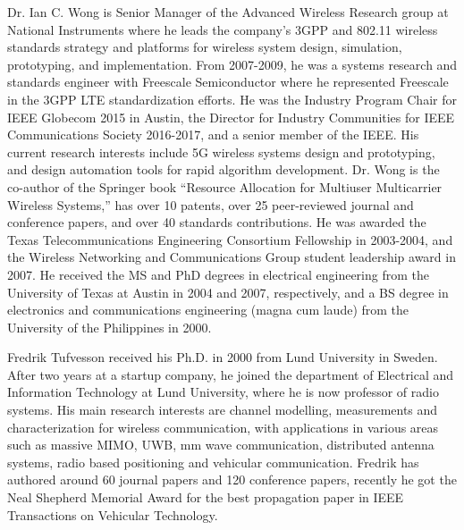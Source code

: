 \documentclass[journal]{IEEEtran}
\begin{document}
%
\begin{IEEEbiography}{Dr. Ian C. Wong}
	is Senior Manager of the Advanced Wireless Research group at National Instruments where he leads the company’s 3GPP and 802.11 wireless standards strategy and platforms for wireless system design, simulation, prototyping, and implementation.  From 2007-2009, he was a systems research and standards engineer with Freescale Semiconductor where he represented Freescale in the 3GPP LTE standardization efforts.  He was the Industry Program Chair for IEEE Globecom 2015 in Austin, the Director for Industry Communities for IEEE Communications Society 2016-2017, and a senior member of the IEEE.  His current research interests include 5G wireless systems design and prototyping, and design automation tools for rapid algorithm development. 
	Dr. Wong is the co-author of the Springer book “Resource Allocation for Multiuser Multicarrier Wireless Systems,” has over 10 patents, over 25 peer-reviewed journal and conference papers, and over 40 standards contributions. He was awarded the Texas Telecommunications Engineering Consortium Fellowship in 2003-2004, and the Wireless Networking and Communications Group student leadership award in 2007.
	He received the MS and PhD degrees in electrical engineering from the University of Texas at Austin in 2004 and 2007, respectively, and a BS degree in electronics and communications engineering (magna cum laude) from the University of the Philippines in 2000.
\end{IEEEbiography} 
%
\begin{IEEEbiography}{Fredrik Tufvesson}
	received his Ph.D. in 2000 from Lund University in Sweden. After two years at a startup company, he joined the department of Electrical and Information Technology at Lund University, where he is now professor of radio systems. His main research interests are channel modelling, measurements and characterization for wireless communication, with applications in various areas such as massive MIMO, UWB, mm wave communication, distributed antenna systems, radio based positioning and vehicular communication. Fredrik has authored around 60 journal papers and 120 conference papers, recently he got the Neal Shepherd Memorial Award for the best propagation paper in IEEE Transactions on Vehicular Technology.
\end{IEEEbiography}
%
\end{document}
